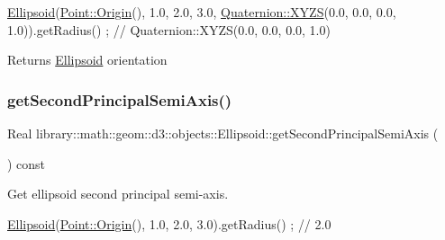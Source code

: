 \begin{DoxyCode}
\hyperlink{classlibrary_1_1math_1_1geom_1_1d3_1_1objects_1_1_ellipsoid_aae81fe0edc7f0e8d4590ea89ae73cb14}{Ellipsoid}(\hyperlink{classlibrary_1_1math_1_1geom_1_1d3_1_1objects_1_1_point_ab2a38e285c562e50bf350272c083986f}{Point::Origin}(), 1.0, 2.0, 3.0, \hyperlink{classlibrary_1_1math_1_1geom_1_1trf_1_1rot_1_1_quaternion_afff9523c7dcbfbbc521736121e62ad41}{Quaternion::XYZS}(0.0, 0.0, 
      0.0, 1.0)).getRadius() ; \textcolor{comment}{// Quaternion::XYZS(0.0, 0.0, 0.0, 1.0)}
\end{DoxyCode}


\begin{DoxyReturn}{Returns}
\hyperlink{classlibrary_1_1math_1_1geom_1_1d3_1_1objects_1_1_ellipsoid}{Ellipsoid} orientation 
\end{DoxyReturn}
\mbox{\label{classlibrary_1_1math_1_1geom_1_1d3_1_1objects_1_1_ellipsoid_abdc2cc0bed7d473f0d4f572afd0de054}} 
\subsubsection{\texorpdfstring{get\+Second\+Principal\+Semi\+Axis()}{getSecondPrincipalSemiAxis()}}
{\footnotesize\ttfamily Real library\+::math\+::geom\+::d3\+::objects\+::\+Ellipsoid\+::get\+Second\+Principal\+Semi\+Axis (\begin{DoxyParamCaption}{ }\end{DoxyParamCaption}) const}



Get ellipsoid second principal semi-\/axis. 


\begin{DoxyCode}
\hyperlink{classlibrary_1_1math_1_1geom_1_1d3_1_1objects_1_1_ellipsoid_aae81fe0edc7f0e8d4590ea89ae73cb14}{Ellipsoid}(\hyperlink{classlibrary_1_1math_1_1geom_1_1d3_1_1objects_1_1_point_ab2a38e285c562e50bf350272c083986f}{Point::Origin}(), 1.0, 2.0, 3.0).getRadius() ; \textcolor{comment}{// 2.0}
\end{DoxyCode}


